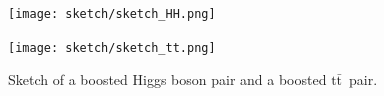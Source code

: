 \documentclass[10pt,a4paper]{article}
\newcommand{\ww}{7.7cm} %
\renewcommand{\tt}{\ensuremath{\text{t}\bar{\text{t}}}}
\newcommand{\channels}{bbWW $\rightarrow$ bb$\ell\nu\ell\nu$, bb$qq\ell\nu$} %
\begin{document}
%	
%	




\begin{figure}[h]
    \begin{minipage}[h!]{\ww}
      \centering
      \texttt{[image: sketch/sketch\_HH.png]}
    \end{minipage}
    \begin{minipage}[h!]{\ww}
      \centering
      \texttt{[image: sketch/sketch\_tt.png]}
    \end{minipage}
  \caption{Sketch of a boosted Higgs boson pair and a boosted \tt\ pair.} \label{sketch}
\end{figure}
\end{document}

